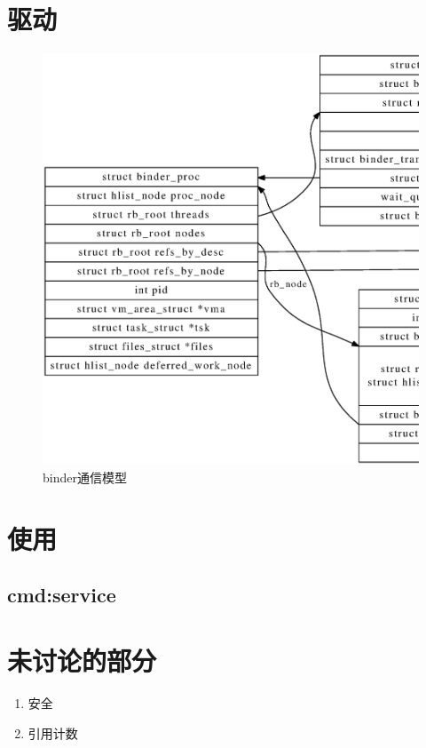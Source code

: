 \documentclass[a4paper,11pt]{article}
\begin{document}
\begin{CJK*}{UTF8}{gbsn}
\section{驱动}
    \begin{figure}[h!]
    \centering
    \includegraphics[keepaspectratio=true, scale=0.4]{dot/driver_data_structure.ps}
    \caption{binder通信模型}
    \end{figure}


\section{使用}
    \subsection{cmd:service}


\section{未讨论的部分}
    \begin{enumerate}
        \item 安全
        \item 引用计数
    \end{enumerate}


\end{CJK*}
\end{document}
